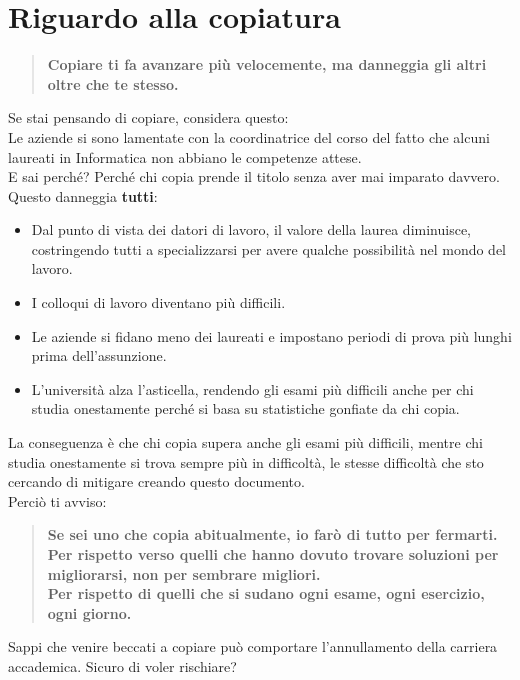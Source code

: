 \documentclass[18pt]{extarticle}
\begin{document}
\section{Riguardo alla copiatura}
\begin{quote}
\textbf{Copiare ti fa avanzare più velocemente, ma danneggia gli altri oltre che te stesso.}
\end{quote}
Se stai pensando di copiare, considera questo:\\
Le aziende si sono lamentate con la coordinatrice del corso del fatto che alcuni laureati in Informatica non abbiano le competenze attese.\\
E sai perché? Perché chi copia prende il titolo senza aver mai imparato davvero.\\
Questo danneggia \textbf{tutti}:
\begin{itemize}
\item Dal punto di vista dei datori di lavoro, il valore della laurea diminuisce, costringendo tutti a specializzarsi per avere qualche possibilità nel mondo del lavoro.
\item I colloqui di lavoro diventano più difficili.
\item Le aziende si fidano meno dei laureati e impostano periodi di prova più lunghi prima dell'assunzione.
\item L'università alza l'asticella, rendendo gli esami più difficili anche per chi studia onestamente perché si basa su statistiche gonfiate da chi copia.
\end{itemize}
La conseguenza è che chi copia supera anche gli esami più difficili, mentre chi studia onestamente si trova sempre più in difficoltà, le stesse difficoltà che sto cercando di mitigare creando questo documento.\\
Perciò ti avviso:
\begin{quote}
\textbf{Se sei uno che copia abitualmente, io farò di tutto per fermarti.\\
Per rispetto verso quelli che hanno dovuto trovare soluzioni per migliorarsi, non per sembrare migliori.\\
Per rispetto di quelli che si sudano ogni esame, ogni esercizio, ogni giorno.}
\end{quote}
Sappi che venire beccati a copiare può comportare l'annullamento della carriera accademica. Sicuro di voler rischiare?
\end{document}
